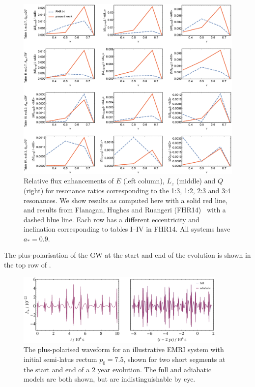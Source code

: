 \begin{figure}
\centering
\includegraphics[width=\textwidth]{res_flux_FHR}
\caption{\label{fig:res-flux-FHR}Relative flux enhancements of $E$ (left column), $L_z$ (middle) and $Q$ (right) for resonance ratios corresponding to the 1:3, 1:2, 2:3 and 3:4 resonances. We show results as computed here with a solid red line, and results from Flanagan, Hughes and Ruangeri (FHR14)~\cite{Flanagan2012a} with a dashed blue line. Each row has a different eccentricity and inclination corresponding to tables I--IV in FHR14. All systems have $a_\ast=0.9$.}
\end{figure}

The plus-polarisation of the GW at the start and end of the evolution is shown in the top row of .
\begin{figure}
\centering
\includegraphics[width=0.92\textwidth]{Fig_good_waveform}
\caption{\label{fig:good-waveform}The plus-polarised waveform for an illustrative EMRI system with initial semi-latus rectum $p_0=7.5$, shown for two short segments at the start and end of a $2$ year evolution. The full and adiabatic models are both shown, but are indistinguishable by eye.}
\end{figure}

